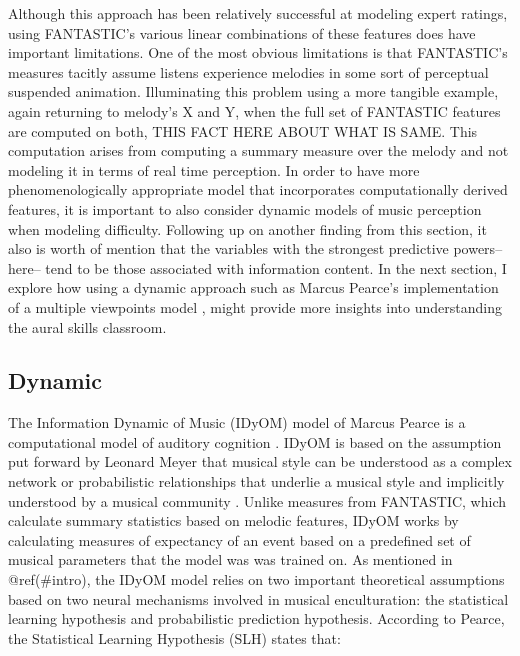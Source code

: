 \documentclass[]{book}
\begin{document}
Although this approach has been relatively successful at modeling expert ratings, using FANTASTIC's various linear combinations of these features does have important limitations.
One of the most obvious limitations is that FANTASTIC's measures tacitly assume listens experience melodies in some sort of perceptual suspended animation.
Illuminating this problem using a more tangible example, again returning to melody's X and Y, when the full set of FANTASTIC features are computed on both, THIS FACT HERE ABOUT WHAT IS SAME.
This computation arises from computing a summary measure over the melody and not modeling it in terms of real time perception.
In order to have more phenomenologically appropriate model that incorporates computationally derived features, it is important to also consider dynamic models of music perception when modeling difficulty.
Following up on another finding from this section, it also is worth of mention that the variables with the strongest predictive powers-- here-- tend to be those associated with information content.
In the next section, I explore how using a dynamic approach such as Marcus Pearce's implementation \citep{pearceConstructionEvaluationStatistical2005, pearceStatisticalLearningProbabilistic2018a} of a multiple viewpoints model \citep{conklinMultipleViewpointSystems1995}, might provide more insights into understanding the aural skills classroom.

\hypertarget{dynamic}{%
\subsection{Dynamic}\label{dynamic}}

The Information Dynamic of Music (IDyOM) model of Marcus Pearce is a computational model of auditory cognition \citep{pearceStatisticalLearningProbabilistic2018a}.
IDyOM is based on the assumption put forward by Leonard Meyer that musical style can be understood as a complex network or probabilistic relationships that underlie a musical style and implicitly understood by a musical community \citep{pearceAuditoryExpectationInformation2012, pearceConstructionEvaluationStatistical2005, pearceStatisticalLearningProbabilistic2018a}.
Unlike measures from FANTASTIC, which calculate summary statistics based on melodic features, IDyOM works by calculating measures of expectancy of an event based on a predefined set of musical parameters that the model was was trained on.
As mentioned in @ref(\#intro), the IDyOM model relies on two important theoretical assumptions based on two neural mechanisms involved in musical enculturation: the statistical learning hypothesis and probabilistic prediction hypothesis.
According to Pearce, the Statistical Learning Hypothesis (SLH) states that:
\end{document}
